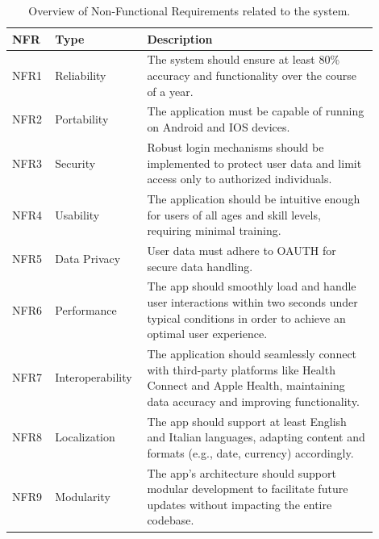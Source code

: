 \begin{table}[h!]
    \centering
    \begin{tabular}{|>{\raggedright\arraybackslash}p{0.1\linewidth}|>{\raggedright\arraybackslash}p{0.2\linewidth}|>{\raggedright\arraybackslash}p{0.6\linewidth}|}
        \hline
        \textbf{NFR} & \textbf{Type} & \textbf{Description} \\
        \hline
        NFR1 & Reliability & The system should ensure at least 80\% accuracy and functionality over the course of a year. \\
        \hline
        NFR2 & Portability & The application must be capable of running on Android and IOS devices. \\
        \hline
        NFR3 & Security & Robust login mechanisms should be implemented to protect user data and limit access only to authorized individuals. \\
        \hline
        NFR4 & Usability & The application should be intuitive enough for users of all ages and skill levels, requiring minimal training. \\
        \hline
        NFR5 & Data Privacy & User data must adhere to OAUTH for secure data handling. \\
        \hline
        NFR6 & Performance & The app should smoothly load and handle user interactions within two seconds under typical conditions in order to achieve an optimal user experience. \\
        \hline
        NFR7 & Interoperability & The application should seamlessly connect with third-party platforms like Health Connect and Apple Health, maintaining data accuracy and improving functionality. \\
        \hline
        NFR8 & Localization & The app should support at least English and Italian languages, adapting content and formats (e.g., date, currency) accordingly. \\
        \hline
        NFR9 & Modularity & The app's architecture should support modular development to facilitate future updates without impacting the entire codebase. \\
        \hline
    \end{tabular}
    \caption{Overview of Non-Functional Requirements related to the system.}
\end{table}
\newpage
